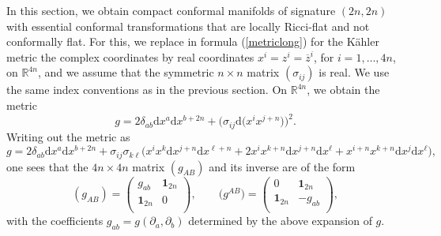 \documentclass[pdftex]{sigma}
\numberwithin{equation}{section}
\newcommand{\1}{\mathbf{1}}
\renewcommand{\d}{{\mathrm d}}
\newcommand{\+}{\oplus}
\renewcommand{\=}{\equiv}
\newcommand{\R}{\mathbb{R}}
\begin{document}
In this section, we obtain compact conformal manifolds of signature $(2n,2n)$ with essential conformal transformations that are locally Ricci-flat and not conformally flat.
 For this, we replace in formula (\ref{metriclong}) for the K\"{a}hler metric the complex coordinates by real coordinates $x^i=z^i=\overline{z}^i$, for $i=1,\ldots, 4n$, on $\R^{4n}$, and we assume that the symmetric {$n\times n$ matrix $(\sigma_{ij})$ is real.} We use the same index conventions as in the previous section.
On $\R^{4n}$, we obtain the metric
\begin{equation}\label{metric4n}
g={2\delta_{ab}} \d x^a \d x^{b+2n}+\bigl( \sigma_{ij} \d\bigl(x^{i}x^{j+n}\bigr)\bigr)^2.
\end{equation}
Writing out the metric as
\[
g={2\delta_{ab}} \d x^a \d x^{b+2n}+
\sigma_{ij}\sigma_{k\ell} \bigl( x^{i}x^{k} \d x^{j+n} \d x^{\ell+n}
+ 2x^{i}x^{k+n} \d x^{j+n} \d x^{\ell}
+x^{i+n}x^{k+n} \d x^{j} \d x^{\ell}\bigr),
\]
one sees that the {$4n \times 4n$ matrix $(g_{AB})$} and its inverse are of the form
\[{(g_{AB})= \begin{pmatrix}
g_{ab} & \1_{2n}
\\
\1_{2n}
 &0\\
\end{pmatrix},\qquad \bigl(g^{AB}\bigr) =
\begin{pmatrix}
0& \1_{2n}
\\
\1_{2n}
 &-g_{ab} \\
\end{pmatrix},}\]
with {the coefficients $g_{ab}=g(\partial_a,\partial_b)$ determined by the above expansion of $g$.}
\end{document}
